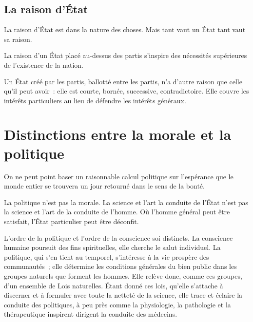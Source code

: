 \documentclass[french,twoside]{book} %
\newcommand{\astermono}{\medskip\centerline{\color{rubric}\large\selectfont{\syms ✻}}\medskip\par}%
\begin{document}
\astermono

\subsection[La raison d’État]{La raison d’État}
\noindent La raison d’État est dans la nature des choses. Mais tant vaut un État tant vaut sa raison.\par
La raison d’un État placé au-dessus des partis s’inspire des nécessités supérieures de l’existence de la nation.\par
Un État créé par les partis, ballotté entre les partis, n’a d’autre raison que celle qu’il peut avoir : elle est courte, bornée, successive, contradictoire. Elle couvre les intérêts particuliers au lieu de défendre les intérêts généraux.
\section[Distinctions entre la morale et la politique]{Distinctions entre la morale et la politique}
\noindent On ne peut point baser un raisonnable calcul politique sur l’espérance que le monde entier se trouvera un jour retourné dans le sens de la bonté.\par

\astermono

\noindent La politique n’est pas la morale. La science et l’art la conduite de l’État n’est pas la science et l’art de la conduite de l’homme. Où l’homme général peut être satisfait, l’État particulier peut être déconfit.\par

\astermono

\noindent L’ordre de la politique et l’ordre de la conscience soi distincts. La conscience humaine poursuit des fins spirituelles, elle cherche le salut individuel. La politique, qui s’en tient au temporel, s’intéresse à la vie prospère des communautés ; elle détermine les conditions générales du bien public dans les groupes naturels que forment les hommes. Elle relève donc, comme ces groupes, d’un ensemble de Lois naturelles. Étant donné ces lois, qu’elle s’attache à discerner et à formuler avec toute la netteté de la science, elle trace et éclaire la conduite des politiques, à peu près comme la physiologie, la pathologie et la thérapeutique inspirent dirigent la conduite des médecins.\par

\astermono
\end{document}
